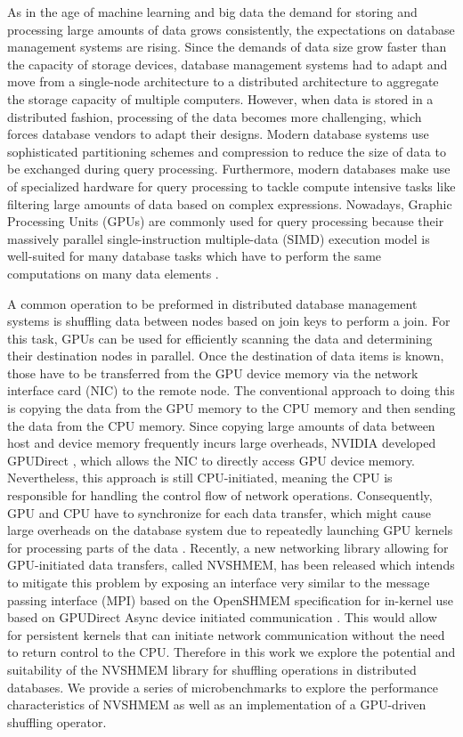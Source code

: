 
As in the age of machine learning and big data the demand for storing and processing large amounts of data grows consistently, the expectations on database management systems are rising.
Since the demands of data size grow faster than the capacity of storage devices, database management systems had to adapt and move from a single-node architecture to a distributed architecture to aggregate the storage capacity of multiple computers.
However, when data is stored in a distributed fashion, processing of the data becomes more challenging, which forces database vendors to adapt their designs.
Modern database systems use sophisticated partitioning schemes and compression to reduce the size of data to be exchanged during query processing.
Furthermore, modern databases make use of specialized hardware for query processing to tackle compute intensive tasks like filtering large amounts of data based on complex expressions.
Nowadays, Graphic Processing Units (GPUs) are commonly used for query processing because their massively parallel single-instruction multiple-data (SIMD) execution model is well-suited for many database tasks which have to perform the same computations on many data elements \cite{subramanian2023}. 

A common operation to be preformed in distributed database management systems is shuffling data between nodes based on join keys to perform a join.
For this task, GPUs can be used for efficiently scanning the data and determining their destination nodes in parallel.
Once the destination of data items is known, those have to be transferred from the GPU device memory via the network interface card (NIC) to the remote node.
The conventional approach to doing this is copying the data from the GPU memory to the CPU memory and then sending the data from the CPU memory.
Since copying large amounts of data between host and device memory frequently incurs large overheads, NVIDIA developed GPUDirect \cite{gilad2011}, which allows the NIC to directly access GPU device memory.
Nevertheless, this approach is still CPU-initiated, meaning the CPU is responsible for handling the control flow of network operations. Consequently, GPU and CPU have to synchronize for each data transfer, which might cause large overheads on the database system due to repeatedly launching GPU kernels for processing parts of the data \cite{taylor2020}.
Recently, a new networking library allowing for GPU-initiated data transfers, called NVSHMEM, has been released which intends to mitigate this problem by exposing an interface very similar to the message passing interface (MPI) based on the OpenSHMEM specification for in-kernel use \cite{potluri2017} based on GPUDirect Async device initiated communication \cite{agostini2017}. This would allow for persistent kernels that can initiate network communication without the need to return control to the CPU. Therefore in this work we explore the potential and suitability of the NVSHMEM library for shuffling operations in distributed databases. We provide a series of microbenchmarks to explore the performance characteristics of NVSHMEM as well as an implementation of a GPU-driven shuffling operator.

